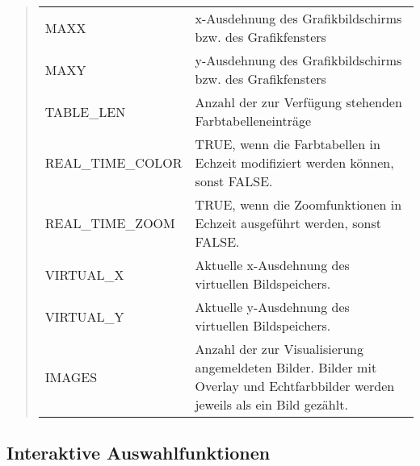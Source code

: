 \begin{quote}
\begin{tabular}{ll}
MAXX&
\begin{minipage}[t]{9cm}
x-Ausdehnung des Grafikbildschirms bzw. des Grafikfensters
\end{minipage}\\
MAXY&
\begin{minipage}[t]{9cm}
y-Ausdehnung des Grafikbildschirms bzw. des Grafikfensters
\end{minipage}\\
TABLE\_LEN&
\begin{minipage}[t]{9cm}
Anzahl der zur Verfügung stehenden Farbtabelleneinträge
\end{minipage}\\
REAL\_TIME\_COLOR&
\begin{minipage}[t]{9cm}
TRUE, wenn die Farbtabellen in Echzeit modifiziert werden können, sonst FALSE.
\end{minipage}\\
REAL\_TIME\_ZOOM&
\begin{minipage}[t]{9cm}
TRUE, wenn die Zoomfunktionen in Echzeit ausgeführt werden, sonst FALSE.
\end{minipage}\\
VIRTUAL\_X&
\begin{minipage}[t]{9cm}
Aktuelle x-Ausdehnung des virtuellen Bildspeichers.
\end{minipage}\\
VIRTUAL\_Y&
\begin{minipage}[t]{9cm}
Aktuelle y-Ausdehnung des virtuellen Bildspeichers.
\end{minipage}\\
IMAGES&
\begin{minipage}[t]{9cm}
Anzahl der zur Visualisierung angemeldeten Bilder. Bilder mit Overlay und
Echtfarbbilder werden jeweils als ein Bild gezählt.
\end{minipage}\\
\end{tabular}
\end{quote}

\subsection{Interaktive Auswahlfunktionen}

